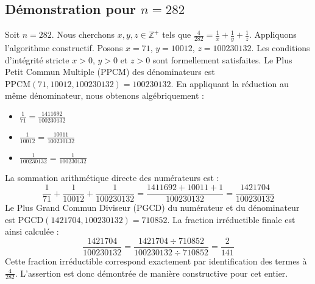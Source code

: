 \documentclass[11pt,a4paper]{article}
\begin{document}
\subsection{Démonstration pour $n = 282$}
Soit $n = 282$. Nous cherchons $x, y, z \in \mathbb{Z}^{+}$ tels que $\frac{4}{282} = \frac{1}{x} + \frac{1}{y} + \frac{1}{z}$.
Appliquons l'algorithme constructif. Posons $x = 71$, $y = 10012$, $z = 100230132$.
Les conditions d'intégrité stricte $x > 0$, $y > 0$ et $z > 0$ sont formellement satisfaites.
Le Plus Petit Commun Multiple (PPCM) des dénominateurs est $\text{PPCM}(71, 10012, 100230132) = 100230132$.
En appliquant la réduction au même dénominateur, nous obtenons algébriquement :
\begin{itemize}
    \item $\frac{1}{71} = \frac{1411692}{100230132}$
    \item $\frac{1}{10012} = \frac{10011}{100230132}$
    \item $\frac{1}{100230132} = \frac{1}{100230132}$
\end{itemize}
La sommation arithmétique directe des numérateurs est :
$$ \frac{1}{71} + \frac{1}{10012} + \frac{1}{100230132} = \frac{1411692 + 10011 + 1}{100230132} = \frac{1421704}{100230132} $$
Le Plus Grand Commun Diviseur (PGCD) du numérateur et du dénominateur est $\text{PGCD}(1421704, 100230132) = 710852$.
La fraction irréductible finale est ainsi calculée :
$$ \frac{1421704}{100230132} = \frac{1421704 \div 710852}{100230132 \div 710852} = \frac{2}{141} $$
Cette fraction irréductible correspond exactement par identification des termes à $\frac{4}{282}$. L'assertion est donc démontrée de manière constructive pour cet entier.
\end{document}
